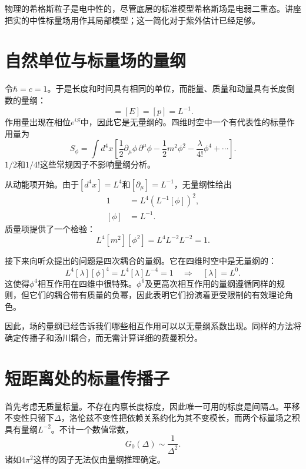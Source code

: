 物理的希格斯粒子是电中性的，尽管底层的标准模型希格斯场是电弱二重态。讲座把实的中性标量场用作其局部模型；这一简化对于紫外估计已经足够。

\section{自然单位与标量场的量纲}

令\(\hbar=c=1\)。于是长度和时间具有相同的单位，而能量、质量和动量具有长度倒数的量纲：
\begin{equation}
[m]=[E]=[p]=L^{-1}.
\end{equation}
作用量出现在相位\(e^{iS}\)中，因此它是无量纲的。四维时空中一个有代表性的标量作用量为
\begin{equation}
S_\phi=\int d^4x\left[
\frac12\partial_\mu\phi\,\partial^\mu\phi
-\frac12m^2\phi^2
-\frac{\lambda}{4!}\phi^4
+\cdots\right].
\end{equation}
\(1/2\)和\(1/4!\)这些常规因子不影响量纲分析。

从动能项开始。由于\([d^4x]=L^4\)和\([\partial_\mu]=L^{-1}\)，无量纲性给出
\begin{align}
1
&=L^4\left(L^{-1}[\phi]\right)^2,\\
[\phi]&=L^{-1}.
\end{align}
质量项提供了一个检验：
\begin{equation}
L^4[m^2][\phi^2]
=L^4L^{-2}L^{-2}=1.
\end{equation}

接下来向听众提出的问题是四次耦合的量纲。它在四维时空中是无量纲的：
\begin{equation}
L^4[\lambda][\phi]^4=L^4[\lambda]L^{-4}=1
\quad\Longrightarrow\quad [\lambda]=L^0.
\end{equation}
这使得\(\phi^4\)相互作用在四维中很特殊。\(\phi^6\)及更高次相互作用的量纲遵循同样的规则，但它们的耦合带有质量的负幂，因此表明它们扮演着更受限制的有效理论角色。

因此，场的量纲已经告诉我们哪些相互作用可以以无量纲系数出现。同样的方法将确定传播子和汤川耦合，而无需计算详细的费曼积分。

\section{短距离处的标量传播子}

首先考虑无质量标量。不存在内禀长度标度，因此唯一可用的标度是间隔\(\Delta\)。平移不变性只留下\(\Delta\)，洛伦兹不变性把依赖关系约化为其不变模长，而两个标量场之积具有量纲\(L^{-2}\)。不计一个数值常数，
\begin{equation}
G_0(\Delta)\sim\frac{1}{\Delta^2}.
\end{equation}
诸如\(4\pi^2\)这样的因子无法仅由量纲推理确定。

